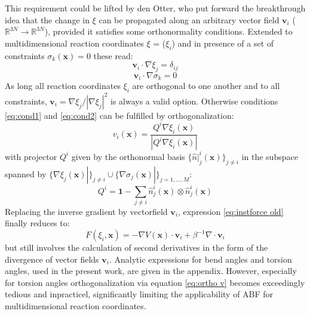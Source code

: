 This requirement could be lifted by den Otter\autocite{den2000thermodynamic}, who put forward the breakthrough idea that the change in $\xi$ can be propagated along an arbitrary vector field $\textbf{v}_i$ ($\mathbb{R}^{3N} \to \mathbb{R}^{3N}$), provided it satisfies some orthonormality conditions.
Extended to multidimensional reaction coordinates \textbf{$\xi$} = ($\xi_i$) and in presence of a set of constraints $\sigma_{k}(\textbf{x})=0$ these read:\autocite{ciccotti2005blue}
\begin{equation}
  \textbf{v}_i \cdot \nabla \xi_j = \delta_{ij} \label{eq:cond1}
\end{equation}
\begin{equation}
  \textbf{v}_i \cdot \nabla \sigma_k = 0 \label{eq:cond2}
\end{equation}
As long all reaction coordinates $\xi_i$ are orthogonal to one another and to all constraints, $\textbf{v}_i = \nabla \xi_j/|\nabla \xi_j|^2$ is always a valid option.
Otherwise conditions \ref{eq:cond1} and \ref{eq:cond2} can be fulfilled by orthogonalization:\autocite{ciccotti2005blue}
\begin{equation}
  v_i (\textbf{x}) = \frac{Q^i \nabla \xi_i (\textbf{x})}{|Q^i \nabla \xi_i (\textbf{x})|} \label{eq:ortho v}
\end{equation}
with projector $Q^i$ given by the orthonormal basis $\{\hat{n}|_{j}^{i}(\textbf{x})\}_{j\neq i}$ in the subspace spanned by $\{\nabla \xi_j (\textbf{x})|\}_{j\neq i} \cup \{\nabla\sigma_j (\textbf{x})|\}_{j=1,...,M}$:
\begin{equation}
  Q^i = \textbf{1} - \sum_{j \neq i} \hat{n}_{j}^{i}(\textbf{x}) \otimes \hat{n}_{j}^{i}(\textbf{x})
\end{equation}
Replacing the inverse gradient by vectorfield $\textbf{v}_i$, expression \ref{eq:instforce old} finally reduces to:
\begin{equation}
  F(\xi_i,\textbf{x}) = -\nabla V(\textbf{x}) \cdot \textbf{v}_i + \beta^{-1} \nabla \cdot \textbf{v}_i
\end{equation}
but still involves the calculation of second derivatives in the form of the divergence of vector fields $\textbf{v}_i$.\autocite{comer2015adaptive} Analytic expressions for bend angles and torsion angles, used in the present work, are given in the appendix. However, especially for torsion angles orthogonalization via equation \ref{eq:ortho v} becomes exceedingly tedious and inpracticel, significantly limiting the applicability of ABF for multidimensional reaction coordinates.

